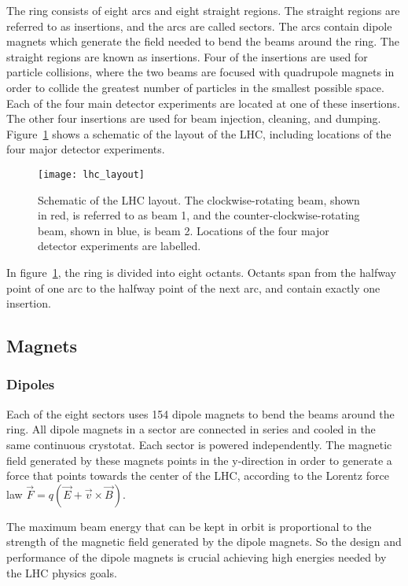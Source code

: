 The ring consists of eight arcs and eight straight regions.
The straight regions are referred to as insertions, and the arcs are called sectors.
The arcs contain dipole magnets which generate the field needed to bend the beams around the ring.
The straight regions are known as insertions.
Four of the insertions are used for particle collisions,
where the two beams are focused with quadrupole magnets in order to collide the greatest number of particles in the smallest possible space.
Each of the four main detector experiments are located at one of these insertions.
The other four insertions are used for beam injection, cleaning, and dumping.
Figure~\ref{fig:lhc_layout} shows a schematic of the layout of the LHC, including locations of the four major detector experiments.

\begin{figure}[!ht]\centering
\texttt{[image: lhc\_layout]}
\caption{Schematic of the LHC layout.
The clockwise-rotating beam, shown in red, is referred to as beam 1, and the counter-clockwise-rotating beam, shown in blue, is beam 2.
Locations of the four major detector experiments are labelled.}
\label{fig:lhc_layout}\cite{lhc-machine-2008}
\end{figure}

In figure~\ref{fig:lhc_layout}, the ring is divided into eight octants.
Octants span from the halfway point of one arc to the halfway point of the next arc,
and contain exactly one insertion.

\subsection{Magnets}\label{subsec:lhc_magnets}

\subsubsection{Dipoles}
Each of the eight sectors uses 154 dipole magnets to bend the beams around the ring.
All dipole magnets in a sector are connected in series and cooled in the same continuous crystotat.
Each sector is powered independently.
The magnetic field generated by these magnets points in the y-direction
in order to generate a force that points towards the center of the LHC,
according to the Lorentz force law $\vec{F} = q\left(\vec{E}+\vec{v}\times\vec{B}\right)$.

The maximum beam energy that can be kept in orbit is proportional to the strength of the magnetic field generated by the dipole magnets.
So the design and performance of the dipole magnets is crucial achieving high energies needed by the LHC physics goals.

